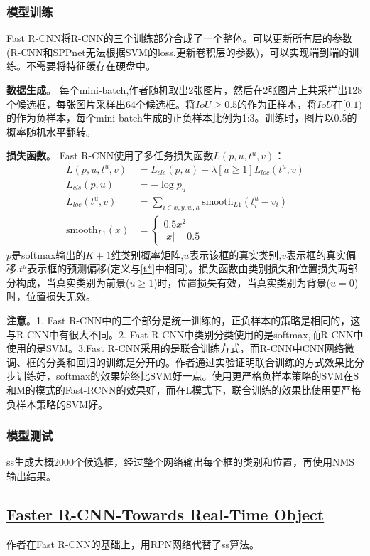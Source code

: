 \documentclass[]{article}
\begin{document}
\subsubsection{模型训练}
\label{Fast R-CNN}
Fast R-CNN将R-CNN的三个训练部分合成了一个整体。可以更新所有层的参数(R-CNN和SPPnet无法根据SVM的loss,更新卷积层的参数)，可以实现端到端的训练。不需要将特征缓存在硬盘中。

\textbf{数据生成}。
每个mini-batch,作者随机取出2张图片，然后在2张图片上共采样出128个候选框，每张图片采样出64个候选框。将$IoU \geq 0.5$的作为正样本，将$IoU$在$[0.1)$的作为负样本，每个mini-batch生成的正负样本比例为1:3。训练时，图片以0.5的概率随机水平翻转。

\textbf{损失函数}。
Fast R-CNN使用了多任务损失函数$L(p,u,t^{u},v)$：
\begin{align}
	L(p,u,t^{u},v)&=L_{cls}(p,u)+\lambda[u\geq1]L_{loc}(t^u,v)\\
	L_{cls}(p,u)&=-\log p_u\\
	L_{loc}(t^u,v)&=\sum_{i\in {x,y,w,h}} \text{smooth}_{L1}(t^u_i - v_i)\\
	\text{smooth}_{L1}(x)&=
	\left\{
	\begin{aligned}
	0.5x^2\\
	|x|-0.5
	\end{aligned}
	\right.
	\end{align}
$p$是softmax输出的$K+1$维类别概率矩阵,$u$表示该框的真实类别,$v$表示框的真实偏移,$t^u$表示框的预测偏移(定义与\ref{t*}中相同)。损失函数由类别损失和位置损失两部分构成，当真实类别为前景($u\geq 1$)时，位置损失有效，当真实类别为背景($u=0$)时，位置损失无效。

\textbf{注意}。1. Fast R-CNN中的三个部分是统一训练的，正负样本的策略是相同的，这与R-CNN中有很大不同。2. Fast R-CNN中类别分类使用的是softmax,而R-CNN中使用的是SVM。3.Fast R-CNN采用的是联合训练方式，而R-CNN中CNN网络微调、框的分类和回归的训练是分开的。作者通过实验证明联合训练的方式效果比分步训练好，softmax的效果始终比SVM好一点。使用更严格负样本策略的SVM在S和M的模式的Fast-RCNN的效果好，而在L模式下，联合训练的效果比使用更严格负样本策略的SVM好。
\subsubsection{模型测试}
ss生成大概2000个候选框，经过整个网络输出每个框的类别和位置，再使用NMS输出结果。

\subsection{\href{./papers/Faster R-CNN-Towards Real-Time Object.pdf}{Faster R-CNN-Towards Real-Time Object}}
作者在Fast R-CNN的基础上，用RPN网络代替了ss算法。
\end{document}
